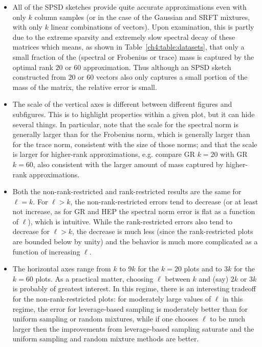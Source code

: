 \begin{itemize}
\item
All of the SPSD sketches provide quite accurate 
approximations even with only $k$ column samples (or 
in the case of the Gaussian and SRFT mixtures, with only $k$ linear 
combinations of vectors). 
Upon examination, this is partly due to the extreme sparsity and extremely 
slow spectral decay of these matrices which means, as shown in 
Table~\ref{ch4:table:datasets}, that only a small fraction of the (spectral or 
Frobenius or trace) mass is captured by the optimal rank $20$ or $60$ 
approximation. 
Thus although an SPSD sketch constructed from $20$ or $60$ vectors also only 
captures a small portion of the mass of the matrix, the relative error is 
small.  
\item
The scale of the vertical axes is different between different figures and 
subfigures.
This is to highlight properties within a given plot, but it can hide 
several things.
In particular, note that the scale for the spectral norm is generally
larger than for the Frobenius norm, which is generally larger than for the
trace norm, consistent with the size of those norms; and that the scale is 
larger for higher-rank approximations, e.g. compare GR $k=20$ with 
GR $k=60$, also consistent with the larger amount of mass captured by 
higher-rank approximations.
\item
Both the non-rank-restricted and rank-restricted results are the same for 
$\ell=k$.
For $\ell > k$, the non-rank-restricted errors tend to decrease (or 
at least not increase, as for GR and HEP the spectral norm error is flat as 
a function of $\ell$), which is intuitive.
While the rank-restricted errors also tend to decrease for $\ell > k$, 
the decrease is much less (since the rank-restricted plots are bounded below 
by unity) and the behavior is much more complicated as a function of 
increasing $\ell$.
\item
The horizontal axes range from $k$ to $9k$ for the $k=20$ plots and to $3k$ for the 
$k=60$ plots.
As a practical matter, choosing $\ell$ between $k$ and (say) $2k$ or $3k$ is 
probably of greatest interest.
In this regime, there is an interesting tradeoff for the non-rank-restricted
plots: for moderately large values of $\ell$ in this regime, the error for 
leverage-based sampling is moderately better than for uniform sampling or 
random mixtures, while if one chooses $\ell$ to be much larger then the 
improvements from leverage-based sampling saturate and the uniform sampling 
and random mixture methods are better.

\end{itemize}
